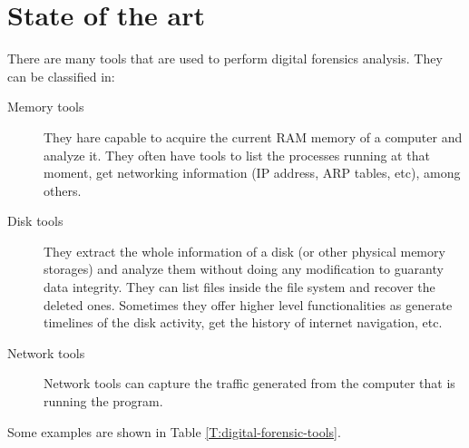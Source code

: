 \chapter{State of the art}
\label{S:state-of-the-art}

There are many tools that are used to perform digital forensics analysis. They
can be classified in: 

\begin{description}
	\item[Memory tools] They hare capable to acquire the current RAM memory of
	a computer and analyze it. They often have tools to list the processes
	running at that moment, get networking information (IP address, ARP tables,
	etc), among others.

	\item[Disk tools] They extract the whole information of a disk (or other
	physical memory storages) and analyze them without doing any modification
	to guaranty data integrity. They can list files inside the file system and
	recover the deleted ones. Sometimes they offer higher level functionalities 
	as generate timelines of the disk activity, get the history of internet
	navigation, etc.

	\item[Network tools] Network tools can capture the traffic generated from 
	the computer that is running the program.
\end{description}

Some examples are shown in Table \ref{T:digital-forensic-tools}.

